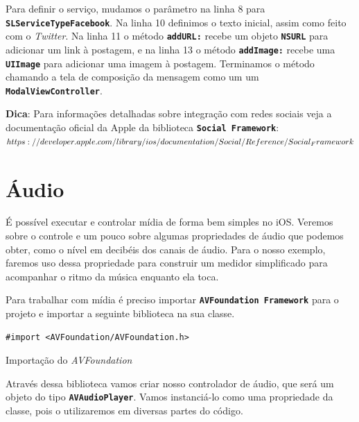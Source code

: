 \documentclass[a4paper,12pt,brazil,doubleside]{book}
\begin{document}
\begin{singlespace}
Para definir o serviço, mudamos o parâmetro na linha 8 para \texttt{\textbf{SLServiceTypeFacebook}}. Na linha 10 definimos o texto inicial, assim como feito com o \emph{Twitter}. Na linha 11 o método \texttt{\textbf{addURL:}} recebe um objeto \texttt{\textbf{NSURL}} para adicionar um link à postagem, e na linha 13 o método \texttt{\textbf{addImage:}} recebe uma \texttt{\textbf{UIImage}} para adicionar uma imagem à postagem. Terminamos o método chamando a tela de composição da mensagem como um um \texttt{\textbf{ModalViewController}}.

\bigskip

\begin{framed}

\textbf{Dica}: Para informações detalhadas sobre integração com redes sociais veja a documentação oficial da Apple da biblioteca \texttt{\textbf{Social Framework}}:\\
\(https://developer.apple.com/library/ios/documentation/Social/Reference/\\Social_Framework\)
\end{framed}

\section{Áudio}


É possível executar e controlar mídia de forma bem simples no iOS. Veremos sobre o controle e um pouco sobre algumas propriedades de áudio que podemos obter, como o nível em decibéis dos canais de áudio. Para o nosso exemplo, faremos uso dessa propriedade para construir um medidor simplificado para acompanhar o ritmo da música enquanto ela toca.

Para trabalhar com mídia é preciso importar \texttt{\textbf{AVFoundation Framework}} para o projeto e importar a seguinte biblioteca na sua classe.

\begin{listing}[H]
\begin{verbatim}
#import <AVFoundation/AVFoundation.h>
\end{verbatim}
\caption{Importação do \emph{AVFoundation}}
\end{listing}


Através dessa biblioteca vamos criar nosso controlador de áudio, que será um objeto do tipo \texttt{\textbf{AVAudioPlayer}}. Vamos instanciá-lo como uma propriedade da classe, pois o utilizaremos em diversas partes do código.


\end{singlespace}
\end{document}

